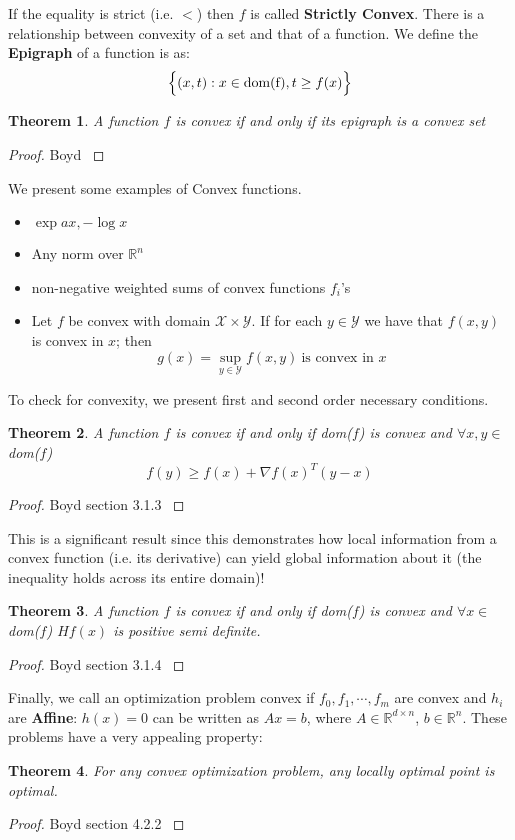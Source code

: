\documentclass[]{article}
\theoremstyle{mattstyle}
\newtheorem{theorem}{Theorem}[section]
\theoremstyle{definition}
\begin{document}
If the equality is strict (i.e. $<$) then $f$ is called \textbf{Strictly Convex}. There is a relationship between convexity of a set and that of a function. We define the \textbf{Epigraph} of a function is as:
$$\Bigl\{ (x,t): x\in \text{dom(f)}, t\ge f(x) \Bigr\}$$

\begin{theorem}
	A function $f$ is convex if and only if its epigraph is a convex set
\end{theorem}
\begin{proof}
	Boyd \cite{Boyd:2004:CO:993483} 
\end{proof}

We present some examples of Convex functions.
\begin{itemize}
	\item $\exp{ax}, -\log x$
	\item Any norm over $\mathbb{R}^n$
	\item non-negative weighted sums of convex functions $f_i$'s
	\item Let $f$ be convex with domain $\mathcal{X} \times \mathcal{Y}$. If for each $y \in \mathcal{Y}$ we have that $f(x,y)$ is convex in $x$; then $$ g(x) = \sup_{y \in \mathcal{Y}} f(x,y) \ \text{is convex in $x$}$$ 
\end{itemize}
To check for convexity, we present first and second order necessary conditions.
\begin{theorem}
	A function $f$ is convex if and only if dom($f$) is convex and $\forall x,y \in$dom($f$)
	$$ f(y) \ge f(x) + \nabla f(x)^T(y-x)$$
\end{theorem}
\begin{proof}
	Boyd section 3.1.3 \cite{Boyd:2004:CO:993483} 
\end{proof}
This is a significant result since this demonstrates how local information from a convex function (i.e. its derivative) can yield global information about it (the inequality holds across its entire domain)!
\begin{theorem}
	A function $f$ is convex if and only if dom($f$) is convex and $\forall x \in$dom($f$) $Hf(x)$ is positive semi definite.
\end{theorem}
\begin{proof}
	Boyd section 3.1.4 \cite{Boyd:2004:CO:993483} 
\end{proof}


Finally, we call an optimization problem convex if $f_0, f_1, \cdots, f_m$ are convex and $h_i$ are \textbf{Affine}: $h(x) = 0$ can be written as $Ax = b$, where $A \in \mathbb{R}^{d \times n}$, $b\in\mathbb{R}^n$. These problems have a very appealing property: 
\begin{theorem}
	For any convex optimization problem, any locally optimal point is optimal.
\end{theorem}
\begin{proof}
	Boyd section 4.2.2 \cite{Boyd:2004:CO:993483} 
\end{proof}
\end{document}
